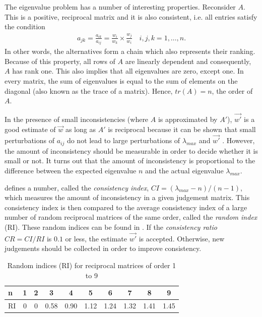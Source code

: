 The eigenvalue problem has a number of interesting properties. Reconsider $A$. This is a positive, reciprocal matrix and it is also consistent, i.e. all entries satisfy the condition
\begin{gather*}
    a_{jk} = \frac{a_{ik}}{a_{ij}} = \frac{w_i}{w_k} \times \frac{w_j}{w_i} \quad i, j, k = 1, \ldots, n.
\end{gather*}
In other words, the alternatives form a chain which also represents their ranking. Because of this property, all rows of $A$ are linearly dependent and consequently, $A$ has rank one. This also implies that all eigenvalues are zero, except one. In every matrix, the sum of eigenvalues is equal to the sum of elements on the diagonal (also known as the trace of a matrix). Hence, $tr(A) = n$, the order of $A$.

In the presence of small inconsistencies (where $A$ is approximated by $A'$), $\vec{w'}$ is a good estimate of $\vec{w}$ as long as $A'$ is reciprocal because it can be shown that small perturbations of $a_{ij}$ do not lead to large perturbations of $\lambda_{max}$ and $\vec{w'}$ \cite{Saaty:1980}. However, the amount of inconsistency should be measurable in order to decide whether it is small or not. It turns out that the amount of inconsistency is proportional to the difference between the expected eigenvalue $n$ and the actual eigenvalue $\lambda_{max}$.

\citet{Saaty:1980} defines a number, called the \emph{consistency index}, $CI = (\lambda_{max} - n) / (n - 1)$, which measures the amount of inconsistency in a given judgement matrix. This consistency index is then compared to the average consistency index of a large number of random reciprocal matrices of the same order, called the \emph{random index} (RI). These random indices can be found in . If the \emph{consistency ratio} $CR = CI / RI$ is $0.1$ or less, the estimate $\vec{w'}$ is accepted. Otherwise, new judgements should be collected in order to improve consistency.

\begin{table}
    \begin{center}
        \begin{tabular}{l*{9}{|c}}
            n & 1 & 2 & 3 & 4 & 5 & 6 & 7 & 8 & 9\\
            \hline
            RI & 0 & 0 & 0.58 & 0.90 & 1.12 & 1.24 & 1.32 & 1.41 & 1.45
        \end{tabular}
        \caption{Random indices (RI) for reciprocal matrices of order 1 to 9}
        \label{tab:ri}
    \end{center}
\end{table}

